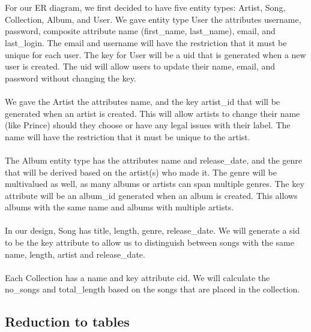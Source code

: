 \documentclass[12pt]{article}
\begin{document}
    \\~\\
    For our ER diagram, we first decided to have five entity types:
    Artist, Song, Collection, Album, and User. We gave entity type User the attributes
    username, password, composite attribute name (first\_name, last\_name), email, and
    last\_login. The email and username will have the restriction that it must be unique
    for each user. The key for User will be a uid that is generated when a new user is
    created. The uid will allow users to update their name, email, and password without
    changing the key.
    \\~\\
    We gave the Artist the attributes name, and the key artist\_id that
    will be generated when an artist is created. This will allow artists to change their
    name (like Prince) should they choose or have any legal issues with their label. The
    name will have the restriction that it must be unique to the artist.
    \\~\\
    The Album entity type has the attributes name and release\_date, and the
    genre that will be derived based on the artist(s) who made it. The genre will be
    multivalued as well, as many albums or artists can span multiple genres. The key
    attribute will be an album\_id generated when an album is created. This allows albums
    with the same name and albums with multiple artists.
    \\~\\
    In our design, Song has title, length, genre, release\_date. We will
    generate a sid to be the key attribute to allow us to distinguish between songs with
    the same name, length, artist and release\_date.
    \\~\\
    Each Collection has a name and key attribute cid. We will calculate
    the no\_songs and total\_length based on the songs that are placed in the collection.



    \subsection{Reduction to tables}
\end{document}
